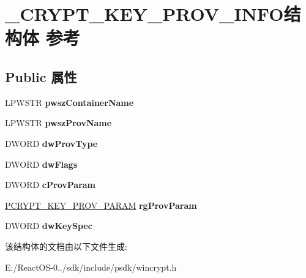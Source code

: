 \hypertarget{struct___c_r_y_p_t___k_e_y___p_r_o_v___i_n_f_o}{}\section{\+\_\+\+C\+R\+Y\+P\+T\+\_\+\+K\+E\+Y\+\_\+\+P\+R\+O\+V\+\_\+\+I\+N\+F\+O结构体 参考}
\label{struct___c_r_y_p_t___k_e_y___p_r_o_v___i_n_f_o}
\subsection*{Public 属性}
\begin{DoxyCompactItemize}
\item 
\mbox{\label{struct___c_r_y_p_t___k_e_y___p_r_o_v___i_n_f_o_a0207579000f2129ff25d8476b4cb3a16}} 
L\+P\+W\+S\+TR {\bfseries pwsz\+Container\+Name}
\item 
\mbox{\label{struct___c_r_y_p_t___k_e_y___p_r_o_v___i_n_f_o_af4e8189d6bd18c3e74208a1f7a98c5c1}} 
L\+P\+W\+S\+TR {\bfseries pwsz\+Prov\+Name}
\item 
\mbox{\label{struct___c_r_y_p_t___k_e_y___p_r_o_v___i_n_f_o_a6ff32c4cebcefbb66c2c551f6edd3f56}} 
D\+W\+O\+RD {\bfseries dw\+Prov\+Type}
\item 
\mbox{\label{struct___c_r_y_p_t___k_e_y___p_r_o_v___i_n_f_o_a999f5b17e063a90fa1b478be645a7d34}} 
D\+W\+O\+RD {\bfseries dw\+Flags}
\item 
\mbox{\label{struct___c_r_y_p_t___k_e_y___p_r_o_v___i_n_f_o_a8a46556ecf7291bcb805c41671805f21}} 
D\+W\+O\+RD {\bfseries c\+Prov\+Param}
\item 
\mbox{\label{struct___c_r_y_p_t___k_e_y___p_r_o_v___i_n_f_o_a9f7617de98caa64d9ab04a312a8c05b3}} 
\hyperlink{struct___c_r_y_p_t___k_e_y___p_r_o_v___p_a_r_a_m}{P\+C\+R\+Y\+P\+T\+\_\+\+K\+E\+Y\+\_\+\+P\+R\+O\+V\+\_\+\+P\+A\+R\+AM} {\bfseries rg\+Prov\+Param}
\item 
\mbox{\label{struct___c_r_y_p_t___k_e_y___p_r_o_v___i_n_f_o_a4a54c8535368a534715dce2652afc38b}} 
D\+W\+O\+RD {\bfseries dw\+Key\+Spec}
\end{DoxyCompactItemize}


该结构体的文档由以下文件生成\+:\begin{DoxyCompactItemize}
\item 
E\+:/\+React\+O\+S-\/0../sdk/include/psdk/wincrypt.\+h\end{DoxyCompactItemize}
